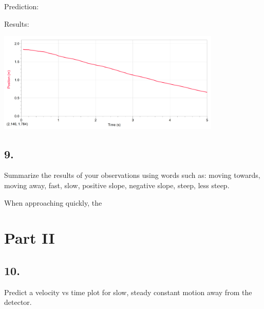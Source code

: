     \begin{mdframed}
        \centering Prediction:


        Results:

        \centering\includegraphics[width=0.8\textwidth]{image20.png}
    \end{mdframed}

    \subsection*{9.}
    Summarize the results of your observations using words such as: moving towards, moving away, fast, slow, positive slope, negative slope, steep, less steep.

    \begin{mdframed}
        When approaching quickly, the 
    \end{mdframed}

    \section*{Part II}

    \subsection*{10.}
    Predict a velocity vs time plot for slow, steady constant motion away from the detector. 

